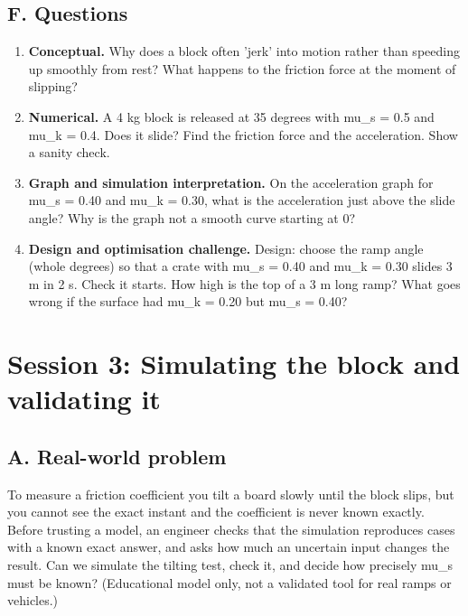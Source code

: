 \documentclass[11pt,a4paper]{article}
\begin{document}
\subsection*{F. Questions}
\begin{enumerate}[nosep]
\item \textbf{Conceptual.} Why does a block often 'jerk' into motion rather than speeding up smoothly from rest? What happens to the friction force at the moment of slipping?
\item \textbf{Numerical.} A 4 kg block is released at 35 degrees with mu\_s = 0.5 and mu\_k = 0.4. Does it slide? Find the friction force and the acceleration. Show a sanity check.
\item \textbf{Graph and simulation interpretation.} On the acceleration graph for mu\_s = 0.40 and mu\_k = 0.30, what is the acceleration just above the slide angle? Why is the graph not a smooth curve starting at 0?
\item \textbf{Design and optimisation challenge.} Design: choose the ramp angle (whole degrees) so that a crate with mu\_s = 0.40 and mu\_k = 0.30 slides 3 m in 2 s. Check it starts. How high is the top of a 3 m long ramp? What goes wrong if the surface had mu\_k = 0.20 but mu\_s = 0.40?
\end{enumerate}

\section{Session 3: Simulating the block and validating it}

\subsection*{A. Real-world problem}
To measure a friction coefficient you tilt a board slowly until the block slips, but you cannot see the exact instant and the coefficient is never known exactly. Before trusting a model, an engineer checks that the simulation reproduces cases with a known exact answer, and asks how much an uncertain input changes the result. Can we simulate the tilting test, check it, and decide how precisely mu\_s must be known? (Educational model only, not a validated tool for real ramps or vehicles.)
\end{document}
